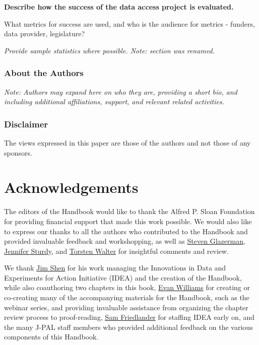 \documentclass[
]{WileySix}
\begin{document}
\textbf{Describe how the success of the data access project is evaluated.}

What metrics for success are used, and who is the audience for metrics - funders, data provider, legislature?

\emph{Provide sample statistics where possible. Note: section was renamed.}

\hypertarget{about-the-authors-10}{%
\subsubsection*{About the Authors}\label{about-the-authors-10}}

\emph{Note: Authors may expand here on who they are, providing a short bio, and including additional affiliations, support, and relevant related activities.}

\hypertarget{disclaimer-1}{%
\subsubsection*{Disclaimer}\label{disclaimer-1}}

The views expressed in this paper are those of the authors and not those of any sponsors.

\hypertarget{handbook_acknowledgements}{%
\section*{Acknowledgements}\label{handbook_acknowledgements}}

The editors of the Handbook would like to thank the Alfred P. Sloan Foundation for providing financial support that made this work possible. We would also like to express our thanks to all the authors who contributed to the Handbook and provided invaluable feedback and workshopping, as well as \href{https://www.poverty-action.org/people/steven-glazerman}{Steven Glazerman}, \href{https://www.bitss.org/people/jennifer-sturdy/}{Jennifer Sturdy}, and \href{https://nyuad.nyu.edu/en/academics/divisions/social-science/faculty/torsten-bernd-norbert-figueiredo-walter.html}{Torsten Walter} for insightful comments and review.

We thank \href{https://www.povertyactionlab.org/person/shen}{Jim Shen} for his work managing the Innovations in Data and Experiments for Action Initiative (IDEA) and the creation of the Handbook, while also coauthoring two chapters in this book, \href{https://www.povertyactionlab.org/person/williams}{Evan Williams} for creating or co-creating many of the accompanying materials for the Handbook, such as the webinar series, and providing invaluable assistance from organizing the chapter review process to proof-reading, \href{https://www.povertyactionlab.org/person/friedlander}{Sam Friedlander} for staffing IDEA early on, and the many J-PAL staff members who provided additional feedback on the various components of this Handbook.
\end{document}
